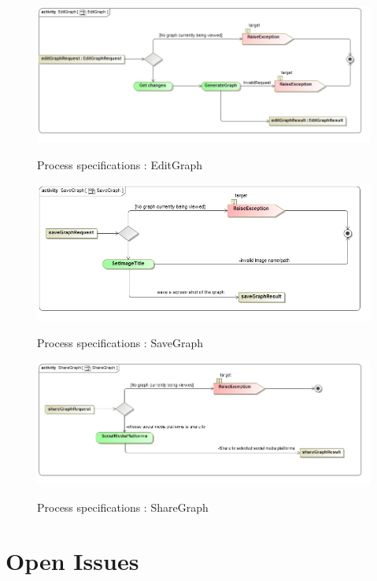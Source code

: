 \documentclass[a4paper,12pt]{article}
\begin{document}
		\begin{figure}[H]
		\includegraphics[width=\textwidth]{Images/act__EditGraph}  \\
		\caption{Process specifications : EditGraph}
	\end{figure}
	
	\begin{figure}[H]
		\includegraphics[width=\textwidth]{Images/act__SaveGraph}  \\
		\caption{Process specifications : SaveGraph}
	\end{figure}
	
	\begin{figure}[H]
		\includegraphics[width=\textwidth]{Images/act__ShareGraph}  \\
		\caption{Process specifications : ShareGraph}
	\end{figure}





\newpage
\section{Open Issues}
\end{document}
